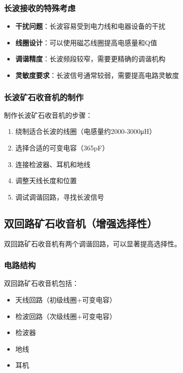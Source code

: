 \documentclass[12pt,UTF8]{ctexbook}
\begin{document}
\subsubsection{长波接收的特殊考虑}
\begin{itemize}[leftmargin=3.5em]
    \item \textbf{干扰问题}：长波容易受到电力线和电器设备的干扰
    \item \textbf{线圈设计}：可以使用磁芯线圈提高电感量和Q值
    \item \textbf{调谐精度}：长波频段较窄，需要更精确的调谐机构
    \item \textbf{灵敏度要求}：长波信号通常较弱，需要提高电路灵敏度
\end{itemize}

\subsubsection{长波矿石收音机的制作}

制作长波矿石收音机的步骤：
\begin{enumerate}[leftmargin=3.5em]
    \item 绕制适合长波的线圈（电感量约2000-3000μH）
    \item 选择合适的可变电容（365pF）
    \item 连接检波器、耳机和地线
    \item 调整天线长度和位置
    \item 调试调谐回路，寻找长波信号
\end{enumerate}

\subsection{双回路矿石收音机（增强选择性）}

双回路矿石收音机有两个调谐回路，可以显著提高选择性。

\subsubsection{电路结构}

双回路矿石收音机包括：
\begin{itemize}[leftmargin=3.5em]
    \item 天线回路（初级线圈+可变电容）
    \item 检波回路（次级线圈+可变电容）
    \item 检波器
    \item 地线
    \item 耳机
\end{itemize}
\end{document}
